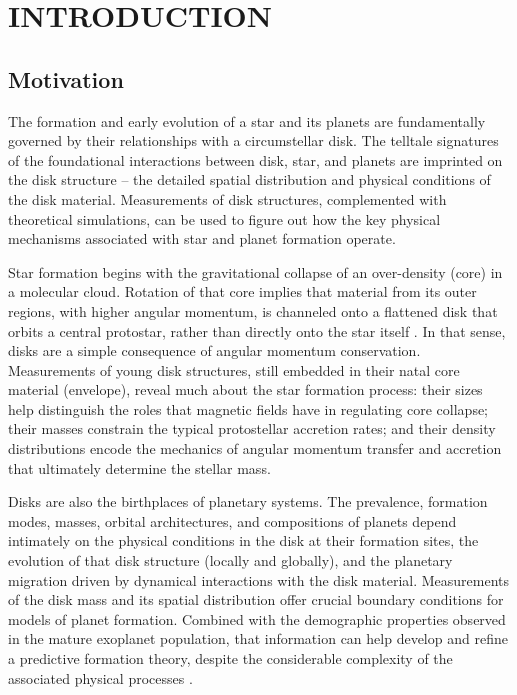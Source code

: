 \documentclass[a4paper]{ar-1col}
\begin{document}
\section{INTRODUCTION} \label{sec:intro}

\subsection{Motivation} \label{sec:motivation}

The formation and early evolution of a star and its planets are fundamentally governed by their relationships with a circumstellar disk.  The telltale signatures of the foundational interactions between disk, star, and planets are imprinted on the disk structure -- the detailed spatial distribution and physical conditions of the disk material.  Measurements of disk structures, complemented with theoretical simulations, can be used to figure out how the key physical mechanisms associated with star and planet formation operate. 

Star formation begins with the gravitational collapse of an over-density (core) in a molecular cloud.  Rotation of that core implies that material from its outer regions, with higher angular momentum, is channeled onto a flattened disk that orbits a central protostar, rather than directly onto the star itself \citep{cassen81,terebey84}.  In that sense, disks are a simple consequence of angular momentum conservation.  Measurements of young disk structures, still embedded in their natal core material (envelope), reveal much about the star formation process: their sizes help distinguish the roles that magnetic fields have in regulating core collapse; their masses constrain the typical protostellar accretion rates; and their density distributions encode the mechanics of angular momentum transfer and accretion that ultimately determine the stellar mass.  

Disks are also the birthplaces of planetary systems.  The prevalence, formation modes, masses, orbital architectures, and compositions of planets depend intimately on the physical conditions in the disk at their formation sites, the evolution of that disk structure (locally and globally), and the planetary migration driven by dynamical interactions with the disk material.  Measurements of the disk mass and its spatial distribution offer crucial boundary conditions for models of planet formation.  Combined with the demographic properties observed in the mature exoplanet population, that information can help develop and refine a predictive formation theory, despite the considerable complexity of the associated physical processes \citep[e.g.,][]{ida04,alibert05}.
\end{document}
